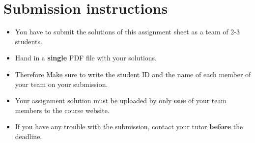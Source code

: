 \section*{Submission instructions}


\begin{itemize}
    \item You have to submit the solutions of this assignment sheet as a team of 2-3 students.
    \item  Hand in a \textbf{single} PDF file with your solutions.
    \item Therefore Make sure to write the student ID and the name of each
    member of your team on your submission.
    \item Your assignment solution must be uploaded by only \textbf{one} of your team members to the course website.
    \item If you have any trouble with the submission, contact your tutor \textbf{before} the deadline.
\end{itemize}


